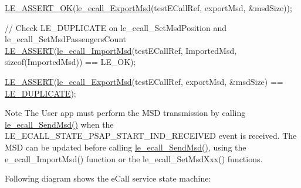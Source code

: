 \begin{DoxyCodeInclude}
    \hyperlink{le__log_8h_a7cd2daa3d4af1de4d29e0eed95187484}{LE\_ASSERT\_OK}(\hyperlink{le__ecall__interface_8h_adc9610dae7a6ba87c064f8dd271a57b4}{le\_ecall\_ExportMsd}(testECallRef, exportMsd, &msdSize));

    \textcolor{comment}{// Check LE\_DUPLICATE on le\_ecall\_SetMsdPosition and le\_ecall\_SetMsdPassengersCount}
    \hyperlink{le__log_8h_ac0dbbef91dc0fed449d0092ff0557b39}{LE\_ASSERT}(\hyperlink{le__ecall__interface_8h_a7d8d8c1e1f49af2f6145836975d20aeb}{le\_ecall\_ImportMsd}(testECallRef, ImportedMsd, \textcolor{keyword}{sizeof}(ImportedMsd))
       == LE\_OK);

    \hyperlink{le__log_8h_ac0dbbef91dc0fed449d0092ff0557b39}{LE\_ASSERT}(\hyperlink{le__ecall__interface_8h_adc9610dae7a6ba87c064f8dd271a57b4}{le\_ecall\_ExportMsd}(testECallRef, exportMsd, &msdSize) == 
      \hyperlink{le__basics_8h_a1cca095ed6ebab24b57a636382a6c86cac26034778a666ee720b110c2fb1647ea}{LE\_DUPLICATE});
\end{DoxyCodeInclude}
 \begin{DoxyNote}{Note}
The User app must perform the M\+SD transmission by calling \hyperlink{le__ecall__interface_8h_a344e4c29208e576e81dda113f786529e}{le\+\_\+ecall\+\_\+\+Send\+Msd()} when the L\+E\+\_\+\+E\+C\+A\+L\+L\+\_\+\+S\+T\+A\+T\+E\+\_\+\+P\+S\+A\+P\+\_\+\+S\+T\+A\+R\+T\+\_\+\+I\+N\+D\+\_\+\+R\+E\+C\+E\+I\+V\+ED event is received. The M\+SD can be updated before calling \hyperlink{le__ecall__interface_8h_a344e4c29208e576e81dda113f786529e}{le\+\_\+ecall\+\_\+\+Send\+Msd()}, using the e\+\_\+ecall\+\_\+\+Import\+Msd() function or the le\+\_\+ecall\+\_\+\+Set\+Msd\+Xxx() functions.
\end{DoxyNote}
Following diagram shows the e\+Call service state machine\+:


